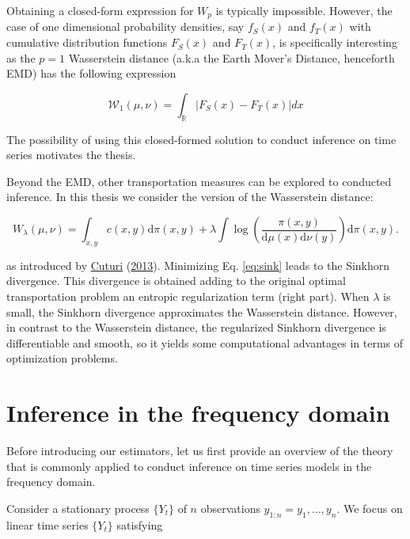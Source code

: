 \documentclass[
  11pt,
]{article}
\begin{document}
Obtaining a closed-form expression for \(W_{p}\) is typically
impossible. However, the case of one dimensional probability densities,
say \(f_{S}(x)\) and \(f_{T}(x)\) with cumulative distribution functions
\(F_{S}(x)\) and \(F_{T}(x)\), is specifically interesting as the
\(p = 1\) Wasserstein distance (a.k.a the Earth Mover's Distance,
henceforth EMD) has the following expression

\begin{equation}
\mathcal{W}_{1}(\mu, \nu)=\int_{\mathbb{R}}\left|F_{S}(x)-F_{T}(x)\right| d x
\label{eq:wass_1}
\end{equation}

The possibility of using this closed-formed solution to conduct
inference on time series motivates the thesis.

Beyond the EMD, other transportation measures can be explored to
conducted inference. In this thesis we consider the version of the
Wasserstein distance:

\begin{equation}
W_{\lambda}(\mu, \nu) =\int_{x, y} c(x, y) \mathrm{d} \pi(x, y)+ \lambda \int \log \left(\frac{\pi(x, y)}{\mathrm{d} \mu(x) \mathrm{d} \nu(y)}\right) \mathrm{d} \pi(x, y). 
\label{eq:sink}
\end{equation}

as introduced by \protect\hyperlink{ref-cuturi2013sinkhorn}{Cuturi}
(\protect\hyperlink{ref-cuturi2013sinkhorn}{2013}). Minimizing Eq.
\ref{eq:sink} leads to the Sinkhorn divergence. This divergence is
obtained adding to the original optimal transportation problem an
entropic regularization term (right part). When \(\lambda\) is small,
the Sinkhorn divergence approximates the Wasserstein distance. However,
in contrast to the Wasserstein distance, the regularized Sinkhorn
divergence is differentiable and smooth, so it yields some computational
advantages in terms of optimization problems.

\hypertarget{inference-in-the-frequency-domain}{%
\section{Inference in the frequency
domain}\label{inference-in-the-frequency-domain}}

Before introducing our estimators, let us first provide an overview of
the theory that is commonly applied to conduct inference on time series
models in the frequency domain.

Consider a stationary process \(\{Y_t\}\) of \(n\) observations
\(y_{1:n} = y_1, … ,y_n\). We focus on linear time series \(\{Y_t\}\)
satisfying
\end{document}
